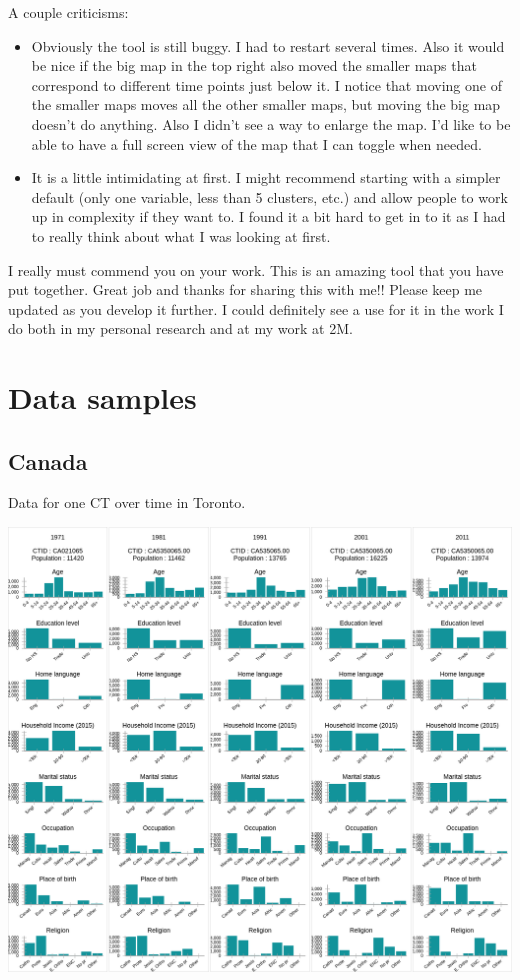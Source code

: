 \documentclass[a4paper]{article}
\begin{document}
A couple criticisms:

\begin{itemize}
  
  \item{Obviously the tool is still buggy. I had to restart several times. Also
  it would be nice if the big map in the top right also moved the smaller maps
  that correspond to different time points just below it. I notice that moving
  one of the smaller maps moves all the other smaller maps, but moving the big
  map doesn’t do anything. Also I didn’t see a way to enlarge the map. I’d like
  to be able to have a full screen view of the map that I can toggle when
  needed.}
  
  \item{It is a little intimidating at first. I might recommend starting with a
  simpler default (only one variable, less than 5 clusters, etc.) and allow
  people to work up in complexity if they want to. I found it a bit hard to get
  in to it as I had to really think about what I was looking at first.}
\end{itemize}

I really must commend you on your work. This is an amazing tool that you have
put together. Great job and thanks for sharing this with me!! Please keep me
updated as you develop it further. I could definitely see a use for it in the
work I do both in my personal research and at my work at 2M.



\clearpage
\section{Data samples}
\subsection{Canada}
Data for one CT over time in Toronto.
\begin{center}
  \includegraphics[width=\linewidth]{SampleCA.png}
  
  \end{center}   
\end{document}
